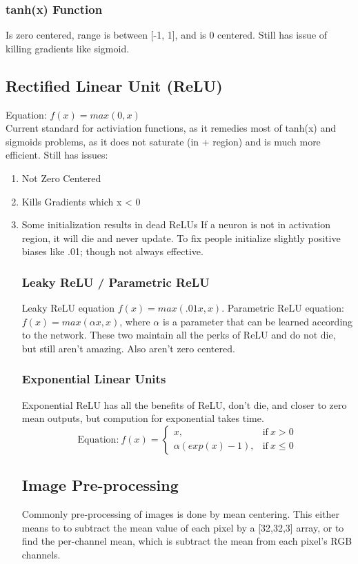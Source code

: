 \documentclass[11pt]{article}
\begin{document}
\subsubsection{tanh(x) Function}
\label{sec-2-2-2}
Is zero centered, range is between [-1, 1], and is 0 centered. Still has issue of killing gradients like sigmoid.
\subsection{Rectified Linear Unit (ReLU)}
\label{sec-2-3}
Equation: $f(x) = max(0,x)$ \\ Current standard for activiation functions, as it remedies most of tanh(x) and sigmoids problems, as it
does not saturate (in + region) and is much more efficient. Still has issues:
\begin{enumerate}
\item Not Zero Centered
\label{sec-2-3-0-1}
\item Kills Gradients which x < 0
\label{sec-2-3-0-2}
\item Some initialization results in dead ReLUs
\label{sec-2-3-0-3}
If a neuron is not in activation region, it will die and never update. 
To fix people initialize slightly positive biases like .01; though not always effective.
\subsubsection{Leaky ReLU / Parametric ReLU}
\label{sec-2-3-1}
Leaky ReLU equation $f(x)=max(.01x, x)$. Parametric ReLU equation: $f(x)=max(\alpha x, x)$, where
$\alpha$ is a parameter that can be learned according to the network. These two maintain all the perks of
ReLU and do not die, but still aren't amazing. Also aren't zero centered.
\subsubsection{Exponential Linear Units}
\label{sec-2-3-2}
Exponential ReLU has all the benefits of ReLU, don't die, and closer to zero mean outputs, but compution for
exponential takes time.
\begin{equation}
\text{Equation:}\ f(x) =  
      \begin{cases}
          x, & \text{if}\ x > 0 \\
          \alpha  (exp(x) - 1), & \text{if}\ x \leq 0
      \end{cases}
\end{equation}
\subsection{Image Pre-processing}
\label{sec-2-4}
Commonly pre-processing of images is done by mean centering. This either means to to subtract the mean
value of each pixel by a [32,32,3] array, or to find the per-channel mean, which is subtract the mean from each
pixel's RGB channels.

\end{enumerate}
\end{document}
